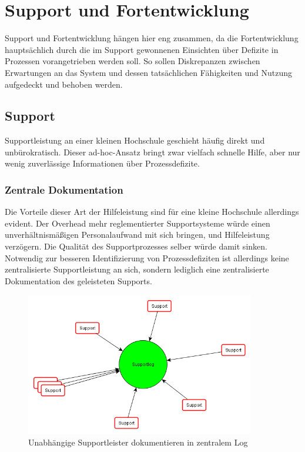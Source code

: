 \section{Support und Fortentwicklung}
Support und Fortentwicklung hängen hier eng zusammen, da die Fortentwicklung hauptsächlich durch die im Support gewonnenen Einsichten über Defizite in Prozessen vorangetrieben werden soll. So sollen Diskrepanzen zwischen Erwartungen an das System und dessen tatsächlichen Fähigkeiten und Nutzung aufgedeckt und behoben werden.

\subsection{Support}
Supportleistung an einer kleinen Hochschule geschieht häufig direkt und unbürokratisch. Dieser ad-hoc-Ansatz bringt zwar vielfach schnelle Hilfe, aber nur wenig zuverlässige Informationen über Prozessdefizite.

\subsubsection{Zentrale Dokumentation}
Die Vorteile dieser Art der Hilfeleistung sind für eine kleine Hochschule allerdings evident. Der Overhead mehr reglementierter Supportsysteme würde einen unverhältnismäßigen Personalaufwand mit sich bringen, und Hilfeleistung verzögern. Die Qualität des Supportprozesses selber würde damit sinken.
Notwendig zur besseren Identifizierung von Prozessdefiziten ist allerdings keine zentralisierte Supportleistung an sich, sondern lediglich eine zentralisierte Dokumentation des geleisteten Supports.

\begin{figure}[h!]
	\centering
	\includegraphics[width=10cm]{kapitel/gruppe3/bilder/grafik_supportlog}
	\caption{Unabhängige Supportleister dokumentieren in zentralem Log}
	\label{fig_zentraler_supportlog}
\end{figure}

